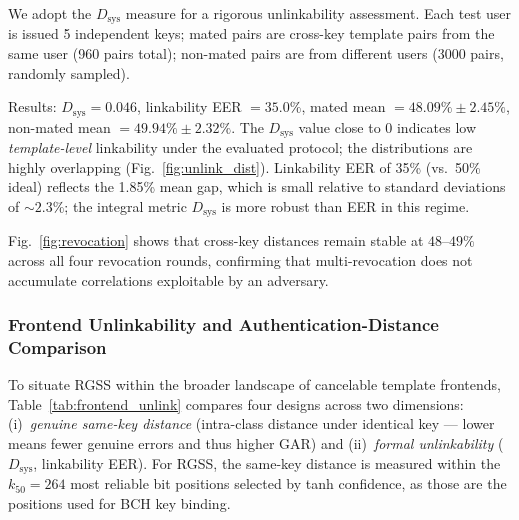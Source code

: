 \documentclass[journal]{IEEEtran}
\begin{document}
We adopt the $D_\text{sys}$ measure \cite{gomez2017unlinkability}
for a rigorous unlinkability assessment.
Each test user is issued 5 independent keys; mated pairs are
cross-key template pairs from the same user (960 pairs total);
non-mated pairs are from different users (3000 pairs, randomly sampled).

Results:
$D_\text{sys} = 0.046$, linkability EER $= 35.0\%$,
mated mean $= 48.09\% \pm 2.45\%$, non-mated mean $= 49.94\% \pm 2.32\%$.
The $D_\text{sys}$ value close to 0 indicates low
\emph{template-level} linkability under the evaluated protocol;
the distributions are highly overlapping (Fig.~\ref{fig:unlink_dist}).
Linkability EER of 35\% (vs.\ 50\% ideal) reflects the 1.85\%
mean gap, which is small relative to standard deviations of ${\sim}2.3\%$;
the integral metric $D_\text{sys}$ is more robust than EER in
this regime.

Fig.~\ref{fig:revocation} shows that cross-key distances remain
stable at $48\text{--}49\%$ across all four revocation rounds,
confirming that multi-revocation does not accumulate correlations
exploitable by an adversary.

\subsubsection{Frontend Unlinkability and Authentication-Distance Comparison}
\label{sec:exp:frontend_unlink}

To situate RGSS within the broader landscape of cancelable template
frontends, Table~\ref{tab:frontend_unlink} compares four designs
across two dimensions: (i)~\emph{genuine same-key distance}
(intra-class distance under identical key — lower means fewer
genuine errors and thus higher GAR) and (ii)~\emph{formal
unlinkability} ($D_\text{sys}$, linkability EER).
For RGSS, the same-key distance is measured within the $k_{50}\!=\!264$
most reliable bit positions selected by tanh confidence, as those are
the positions used for BCH key binding.
\end{document}
